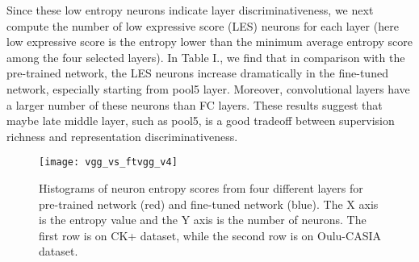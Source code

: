 \documentclass[a4paper, 10pt, conference]{ieeeconf}      %
\begin{document}
Since these low entropy neurons indicate layer discriminativeness, we next compute the number of low expressive score (LES) neurons for each layer (here low expressive score is the entropy lower than the minimum average entropy score among the four selected layers). In Table I., we find that in comparison with the pre-trained network, the LES neurons increase dramatically in the fine-tuned network, especially starting from pool5 layer. Moreover, convolutional layers have a larger number of these neurons than FC layers. 
These results suggest that maybe late middle layer, such as pool5, is a good tradeoff between supervision richness and representation discriminativeness.


\begin{figure*}
  \texttt{[image: vgg\_vs\_ftvgg\_v4]}
  \caption{Histograms of neuron entropy scores from four different layers for pre-trained network (red) and fine-tuned network (blue). The X axis is the entropy value and the Y axis is the number of neurons. The first row is on CK+ dataset, while the second row is on Oulu-CASIA dataset.}
  \label{vgg_vs_ftvgg}
  \vspace{-1mm}
\end{figure*}


\end{document}
